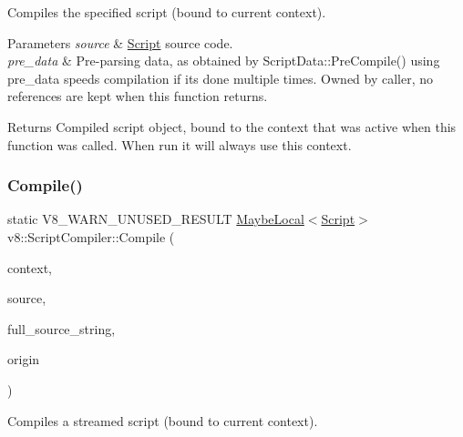 Compiles the specified script (bound to current context).


\begin{DoxyParams}{Parameters}
{\em source} & \mbox{\hyperlink{classv8_1_1Script}{Script}} source code. \\
\hline
{\em pre\+\_\+data} & Pre-\/parsing data, as obtained by Script\+Data\+::\+Pre\+Compile() using pre\+\_\+data speeds compilation if it\textquotesingle{}s done multiple times. Owned by caller, no references are kept when this function returns. \\
\hline
\end{DoxyParams}
\begin{DoxyReturn}{Returns}
Compiled script object, bound to the context that was active when this function was called. When run it will always use this context. 
\end{DoxyReturn}
\mbox{\label{classv8_1_1ScriptCompiler_a2381d1572e778efee274caaaaa765e0c}} 
\subsubsection{\texorpdfstring{Compile()}{Compile()}\hspace{0.1cm}{\footnotesize\ttfamily [2/2]}}
{\footnotesize\ttfamily static V8\+\_\+\+W\+A\+R\+N\+\_\+\+U\+N\+U\+S\+E\+D\+\_\+\+R\+E\+S\+U\+LT \mbox{\hyperlink{classv8_1_1MaybeLocal}{Maybe\+Local}}$<$\mbox{\hyperlink{classv8_1_1Script}{Script}}$>$ v8\+::\+Script\+Compiler\+::\+Compile (\begin{DoxyParamCaption}\item[{\mbox{\hyperlink{classv8_1_1Local}{Local}}$<$ Context $>$}]{context,  }\item[{\mbox{\hyperlink{classv8_1_1ScriptCompiler_1_1StreamedSource}{Streamed\+Source}} $\ast$}]{source,  }\item[{\mbox{\hyperlink{classv8_1_1Local}{Local}}$<$ \mbox{\hyperlink{classv8_1_1String}{String}} $>$}]{full\+\_\+source\+\_\+string,  }\item[{const \mbox{\hyperlink{classv8_1_1ScriptOrigin}{Script\+Origin}} \&}]{origin }\end{DoxyParamCaption})\hspace{0.3cm}{\ttfamily [static]}}

Compiles a streamed script (bound to current context).

